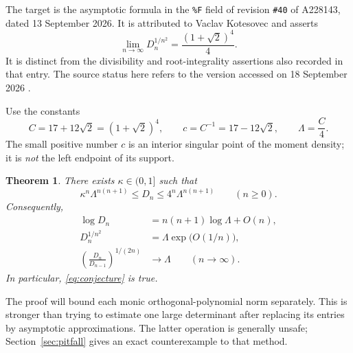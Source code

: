 \documentclass[11pt,a4paper]{article}
\numberwithin{equation}{section}
\newtheorem{theorem}{Theorem}[section]
\theoremstyle{remark}\newtheorem{remark}[theorem]{Remark}
\begin{document}
The target is the asymptotic formula in the \texttt{\%F} field of revision
\texttt{\#40} of A228143, dated 13 September 2026. It is attributed to Vaclav
Kotesovec and asserts
\begin{equation}\label{eq:conjecture}
 \lim_{n\to\infty}D_n^{1/n^2}=\frac{(1+\sqrt2)^4}{4}.
\end{equation}
It is distinct from the divisibility and root-integrality assertions also
recorded in that entry. The source status here refers to the version accessed
on 18 September 2026 \cite{oeis-hankel}.

Use the constants
\begin{equation}\label{eq:constants}
 C=17+12\sqrt2=(1+\sqrt2)^4,\qquad
 c=C^{-1}=17-12\sqrt2,\qquad \Lambda=\frac C4.
\end{equation}
The small positive number $c$ is an interior singular point of the moment
density; it is \emph{not} the left endpoint of its support.

\begin{theorem}\label{thm:main}
There exists $\kappa\in(0,1]$ such that
\begin{equation}\label{eq:sandwich}
 \kappa^n\Lambda^{n(n+1)}\leq D_n\leq
 4^n\Lambda^{n(n+1)}\qquad(n\geq0).
\end{equation}
Consequently,
\begin{align}
 \log D_n&=n(n+1)\log\Lambda+O(n),\label{eq:logmain}\\
 D_n^{1/n^2}&=\Lambda\exp\bigl(O(1/n)\bigr),\label{eq:rootmain}\\
 \left(\frac{D_n}{D_{n-1}}\right)^{1/(2n)}&\longrightarrow\Lambda
 \qquad(n\to\infty).\label{eq:ratiomain}
\end{align}
In particular, \eqref{eq:conjecture} is true.
\end{theorem}

The proof will bound each monic orthogonal-polynomial norm separately.
This is stronger than trying to estimate one large determinant after replacing
its entries by asymptotic approximations. The latter operation is generally
unsafe; Section~\ref{sec:pitfall} gives an exact counterexample to that method.
\end{document}
